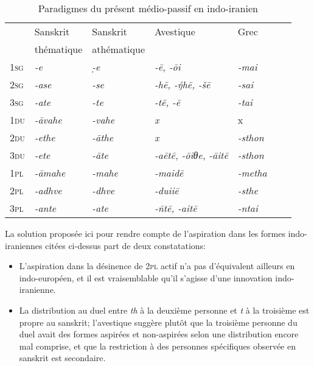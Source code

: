 \documentclass[oldfontcommands,oneside,a4paper,11pt]{article}
\newcommand{\ipa}[1]{{\phon\textit{#1}}} %
\newcommand{\grise}[1]{\cellcolor{lightgray}\textbf{#1}}
\begin{document}
\begin{table}[H]
\caption{Paradigmes du présent médio-passif  en indo-iranien}  \label{tab:medio}
\begin{tabular}{lllllll}
\toprule
 & 	Sanskrit  & 	Sanskrit & 	Avestique & 	Grec & 	\\
 &thématique&athématique&&\\
 \midrule
\textsc{1sg} & 	\ipa{-e} & 	\ipa{-̣e} & 	\ipa{-ē, -ōi} & 	\ipa{-mai} & 	\\
\textsc{2sg} & 	\ipa{-ase} & 	\ipa{-se} & 	\ipa{-hē, -ŋ́hē, -šē} & 	\ipa{-sai} & 	\\
\textsc{3sg} & 	\ipa{-ate} & 	\ipa{-te} & 	\ipa{-tē, -ē} & 	\ipa{-tai} & 	\\
\textsc{1du} & 	\ipa{-āvahe} & 	\ipa{-vahe} & 	\ipa{x} & 	x& 	\\
\textsc{2du} & 	\ipa{-ethe} \grise{}& 	\ipa{-āthe} \grise{}& 	\ipa{x} \grise{}& 		\ipa{-sthon} & 	\\
\textsc{3du} & 	\ipa{-ete}\grise{} & 	\ipa{-āte}\grise{} & 	\ipa{-aētē, -ōiθe, -āitē} \grise{}& 	\ipa{-sthon} & 	\\
\textsc{1pl} & 	\ipa{-āmahe} & 	\ipa{-mahe} & 	\ipa{-maidē} & 	\ipa{-metha}& 	\\
\textsc{2pl} & 	\ipa{-adhve} & 	\ipa{-dhve} & 	\ipa{-duiiē} & 	\ipa{-sthe} & 	\\
\textsc{3pl} & 	\ipa{-ante} & 	\ipa{-ate} & 	\ipa{-n̄tē, -aitē} & 	\ipa{-ntai} & 	\\
\bottomrule
\end{tabular}
\end{table}
 
La solution proposée ici pour rendre compte de l'aspiration dans les formes indo-iraniennes citées ci-dessus part de deux constatations:

\begin{itemize}
\item L'aspiration dans la désinence de \textsc{2pl} actif n'a pas d'équivalent ailleurs en indo-européen, et il est vraisemblable qu'il s'agisse d'une innovation indo-iranienne.
\item La distribution au duel entre \ipa{th} à la deuxième personne et \ipa{t} à la troisième est propre au sanskrit; l'avestique suggère plutôt que la troisième personne du duel avait des formes aspirées et non-aspirées selon une distribution encore mal comprise, et que la restriction à des personnes spécifiques observée en sanskrit est secondaire.
\end{itemize}
\end{document}
